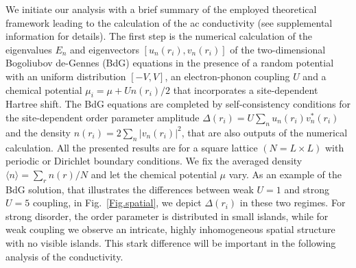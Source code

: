 \documentclass[Collective.tex]{revtex4-1}
\begin{document}
We initiate our analysis with a brief summary of the employed theoretical framework leading to the calculation of the ac conductivity (see supplemental information \cite{Supplementary} for details). The first step is the numerical calculation of the eigenvalues $E_n$ and eigenvectors $[u_n(r_i), v_n(r_i)]$  
of the two-dimensional Bogoliubov de-Gennes (BdG) equations in the presence of a random potential \cite{DeGennes1964, DeGennes1966, Ghosal2001, ghosal1998}
with an uniform distribution $[-V,V]$, an electron-phonon coupling $U$ and a chemical potential  $\mu_i = \mu + Un(r_i)/2$ that incorporates a site-dependent Hartree shift. The BdG equations are 
completed by self-consistency conditions for the site-dependent order parameter amplitude $\Delta(r_i) = U\sum_{n}u_n(r_i)v_n^*(r_i)$ and the density $n(r_i) = 2\sum_{n}|v_n(r_i)|^2$,
that are also outputs of the numerical calculation. 
%
All the presented results are for a square lattice $(N=L\times L)$ with periodic or Dirichlet boundary conditions. We fix the averaged density $\langle n \rangle =\sum_{r}n(r)/N$ and let the chemical potential $\mu$ vary.
As an example of the BdG solution, that illustrates the differences between weak $U =1$ and strong $U=5$ coupling, in Fig.~\ref{Fig.spatial}, we depict $\Delta(r_i)$ in these two regimes. For strong disorder, the order parameter is distributed in small islands, while for weak coupling we observe an intricate, highly inhomogeneous spatial structure with no visible islands. This stark difference will be important in the following analysis of the conductivity. 
%
\end{document}
